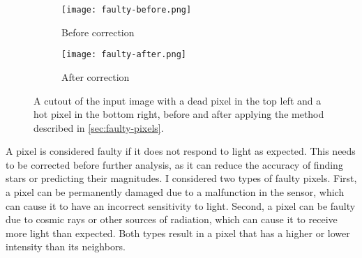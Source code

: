 \begin{figure}[tb]
  \centering
  \begin{subfigure}{.49\textwidth}
    \centering
    \texttt{[image: faulty-before.png]}
    \caption{Before correction}
    \label{fig:faulty-before}
  \end{subfigure}%
  \hfill
  \begin{subfigure}{.49\textwidth}
    \centering
    \texttt{[image: faulty-after.png]}
    \caption{After correction}
    \label{fig:faulty-after}
  \end{subfigure}
  \caption{A cutout of the input image with a dead pixel in the top left and a hot pixel
    in the bottom right, before and after applying the method described in
    \autoref{sec:faulty-pixels}.}
  \label{fig:faulty-pixels}
\end{figure}

A pixel is considered faulty if it does not respond to light as expected. This needs to be
corrected before further analysis, as it can reduce the accuracy of finding stars or
predicting their magnitudes. I considered two types of faulty pixels. First, a pixel can
be permanently damaged due to a malfunction in the sensor, which can cause it to have an
incorrect sensitivity to light. Second, a pixel can be faulty due to cosmic rays or other
sources of radiation, which can cause it to receive more light than expected. Both types
result in a pixel that has a higher or lower intensity than its neighbors.

